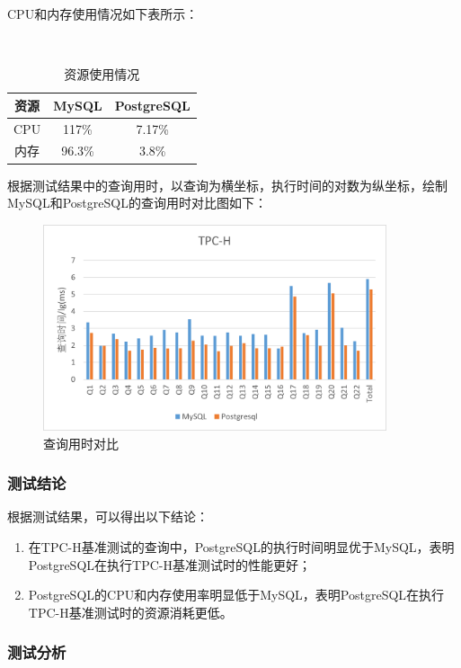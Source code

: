 \documentclass{article}
\begin{document}
CPU和内存使用情况如下表所示：

\begin{table}[H]
  \caption{资源使用情况}
  ~\\
  \centering
  \begin{tabular}{ccc}
    \hline
    \textbf{资源} & \textbf{MySQL} & \textbf{PostgreSQL} \\
    \hline
    CPU & 117\% & 7.17\% \\
    内存 & 96.3\% & 3.8\% \\
    \hline
  \end{tabular}
\end{table}

根据测试结果中的查询用时，以查询为横坐标，执行时间的对数为纵坐标，绘制MySQL和PostgreSQL的查询用时对比图如下：

\begin{figure}[H]
\centering
\includegraphics[width=0.9\textwidth]{img/20.png}
\caption{查询用时对比}
\end{figure}

\subsubsection{测试结论}

根据测试结果，可以得出以下结论：

\begin{enumerate}[noitemsep]
  \item 在TPC-H基准测试的查询中，PostgreSQL的执行时间明显优于MySQL，表明PostgreSQL在执行TPC-H基准测试时的性能更好；
  \item PostgreSQL的CPU和内存使用率明显低于MySQL，表明PostgreSQL在执行TPC-H基准测试时的资源消耗更低。
\end{enumerate}

\subsubsection{测试分析}
\end{document}
